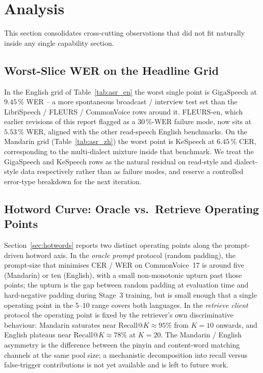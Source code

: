 \section{Analysis}
\label{sec:analysis}

This section consolidates cross-cutting observations that did not fit
naturally inside any single capability section.

\subsection{Worst-Slice WER on the Headline Grid}

In the English grid of Table~\ref{tab:asr_en} the worst single
point is GigaSpeech at $9.45$\,\% WER -- a more spontaneous
broadcast / interview test set than the LibriSpeech / FLEURS /
CommonVoice rows around it. FLEURS-en, which earlier revisions of
this report flagged as a $30$\,\%-WER failure mode, now sits at
$5.53$\,\% WER, aligned with the other read-speech English
benchmarks. On the Mandarin grid (Table~\ref{tab:asr_zh}) the
worst point is KeSpeech at $6.45$\,\% CER, corresponding to the
multi-dialect mixture inside that benchmark. We treat the
GigaSpeech and KeSpeech rows as the natural residual on read-style
and dialect-style data respectively rather than as failure modes,
and reserve a controlled error-type breakdown for the next
iteration.

\subsection{Hotword Curve: Oracle vs.\ Retrieve Operating Points}
\label{subsec:why-five}

Section~\ref{sec:hotwords} reports two distinct operating points
along the prompt-driven hotword axis. In the \emph{oracle prompt}
protocol (random padding), the prompt-size that minimises CER /
WER on CommonVoice~17 is around five (Mandarin) or ten (English),
with a small non-monotonic upturn past those points; the upturn is
the gap between random padding at evaluation time and hard-negative
padding during Stage~3 training, but is small enough that a single
operating point in the $5$--$10$ range covers both languages. In
the \emph{retrieve client} protocol the operating point is fixed
by the retriever's own discriminative behaviour: Mandarin saturates
near Recall@$K \approx 95\%$ from $K = 10$ onwards, and English
plateaus near Recall@$K \approx 78\%$ at $K = 20$. The
Mandarin / English asymmetry is the difference between the pinyin
and content-word matching channels at the same pool size; a
mechanistic decomposition into recall versus false-trigger
contributions is not yet available and is left to future work.

